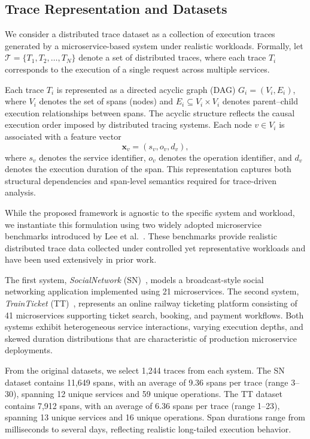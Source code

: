 \documentclass[sigconf,review]{acmart}
\begin{document}
\subsection{Trace Representation and Datasets}
\label{sec:dataset}

We consider a distributed trace dataset as a collection of execution traces generated by a microservice-based system under realistic workloads. Formally, let $\mathcal{T} = \{T_1, T_2, \dots, T_N\}$ denote a set of distributed traces, where each trace $T_i$ corresponds to the execution of a single request across multiple services.

Each trace $T_i$ is represented as a directed acyclic graph (DAG) $G_i = (V_i, E_i)$, where $V_i$ denotes the set of spans (nodes) and $E_i \subseteq V_i \times V_i$ denotes parent--child execution relationships between spans. The acyclic structure reflects the causal execution order imposed by distributed tracing systems. Each node $v \in V_i$ is associated with a feature vector
\[
\mathbf{x}_v = (s_v, o_v, d_v),
\]
where $s_v$ denotes the service identifier, $o_v$ denotes the operation identifier, and $d_v$ denotes the execution duration of the span. This representation captures both structural dependencies and span-level semantics required for trace-driven analysis.

While the proposed framework is agnostic to the specific system and workload, we instantiate this formulation using two widely adopted microservice benchmarks introduced by Lee et al.~\cite{DBLP:conf/icse/LeeYCSL23}. These benchmarks provide realistic distributed trace data collected under controlled yet representative workloads and have been used extensively in prior work.

The first system, \emph{SocialNetwork} (SN)~\cite{gan2019open}, models a broadcast-style social networking application implemented using 21 microservices. The second system, \emph{TrainTicket} (TT)~\cite{zhou2018benchmarking}, represents an online railway ticketing platform consisting of 41 microservices supporting ticket search, booking, and payment workflows. Both systems exhibit heterogeneous service interactions, varying execution depths, and skewed duration distributions that are characteristic of production microservice deployments.

From the original datasets, we select 1,244 traces from each system. The SN dataset contains 11,649 spans, with an average of 9.36 spans per trace (range 3--30), spanning 12 unique services and 59 unique operations. The TT dataset contains 7,912 spans, with an average of 6.36 spans per trace (range 1--23), spanning 13 unique services and 16 unique operations. Span durations range from milliseconds to several days, reflecting realistic long-tailed execution behavior.
\end{document}
